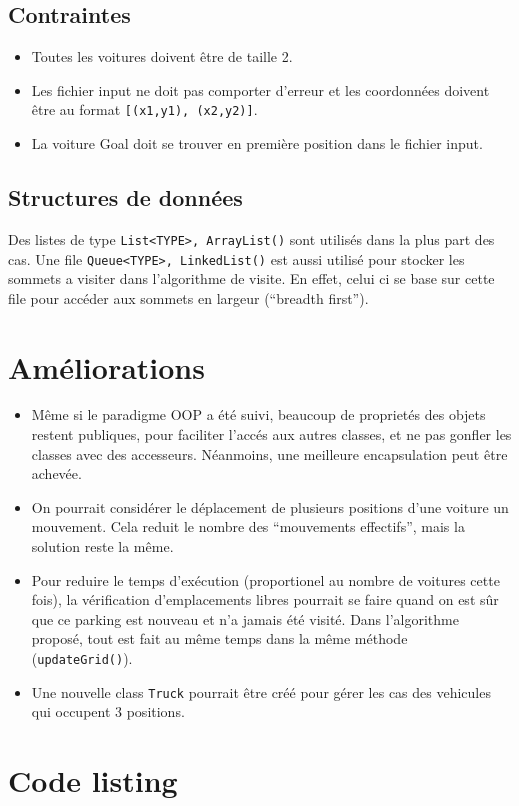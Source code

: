 \documentclass[11pt,a4paper]{article}
\begin{document}
\subsection{Contraintes}

\begin{itemize}
\item Toutes les voitures doivent être de taille 2.
\item Les fichier input ne doit pas comporter d'erreur et les
  coordonnées doivent être au format \texttt{[(x1,y1), (x2,y2)]}.
\item La voiture Goal doit se trouver en première position dans le
  fichier input.
\end{itemize}

\subsection{Structures de données}

Des listes de type \texttt{List<TYPE>, ArrayList()} sont utilisés dans
la plus part des cas. Une file \texttt{Queue<TYPE>, LinkedList()} est
aussi utilisé pour stocker les sommets a visiter dans l'algorithme de
visite. En effet, celui ci se base sur cette file pour accéder aux
sommets en largeur (``breadth first'').

\section{Améliorations}

\begin{itemize}
\item Même si le paradigme OOP a été suivi, beaucoup de proprietés des
  objets restent publiques, pour faciliter l'accés aux autres classes,
  et ne pas gonfler les classes avec des accesseurs. Néanmoins, une
  meilleure encapsulation peut être achevée.
\item On pourrait considérer le déplacement de plusieurs positions
  d'une voiture un mouvement. Cela reduit le nombre des ``mouvements
  effectifs'', mais la solution reste la même.
\item Pour reduire le temps d'exécution (proportionel au nombre de
  voitures cette fois), la vérification d'emplacements libres pourrait
  se faire quand on est sûr que ce parking est nouveau et n'a jamais
  été visité. Dans l'algorithme proposé, tout est fait au même temps
  dans la même méthode (\texttt{updateGrid()}).
\item Une nouvelle class \texttt{Truck} pourrait être créé pour gérer
  les cas des vehicules qui occupent 3 positions.

\end{itemize}


\newpage

\section{Code listing}


\newpage

\newpage

\newpage

\end{document}
